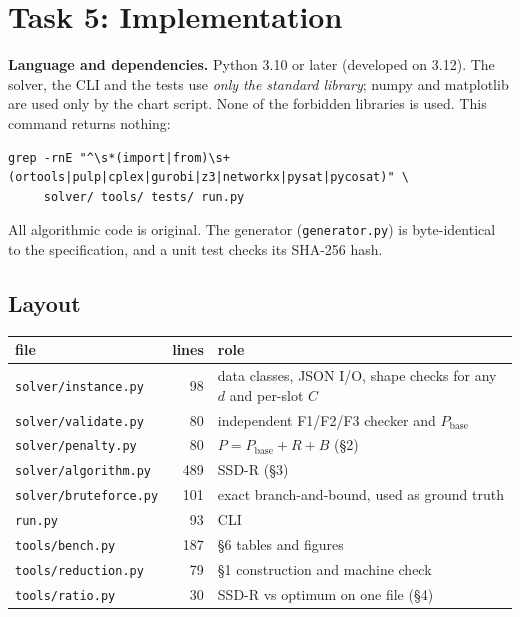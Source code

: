 \section{Task 5: Implementation}

\textbf{Language and dependencies.} Python 3.10 or later (developed on
3.12). The solver, the CLI and the tests use \emph{only the standard
library}; numpy and matplotlib are used only by the chart script. None of
the forbidden libraries is used. This command returns nothing:
\begin{verbatim}
grep -rnE "^\s*(import|from)\s+(ortools|pulp|cplex|gurobi|z3|networkx|pysat|pycosat)" \
     solver/ tools/ tests/ run.py
\end{verbatim} All algorithmic code is original. The
generator (\texttt{generator.py}) is byte-identical to the specification,
and a unit test checks its SHA-256 hash.

\subsection{Layout}
\begin{center}\small
\begin{tabular}{l r l}
\toprule
file & lines & role\\
\midrule
\texttt{solver/instance.py} & 98 & data classes, JSON I/O, shape checks for any $d$ and per-slot $C$\\
\texttt{solver/validate.py} & 80 & independent F1/F2/F3 checker and $P_{\text{base}}$\\
\texttt{solver/penalty.py} & 80 & $P = P_{\text{base}} + R + B$ (\S2)\\
\texttt{solver/algorithm.py} & 489 & SSD-R (\S3)\\
\texttt{solver/bruteforce.py} & 101 & exact branch-and-bound, used as ground truth\\
\texttt{run.py} & 93 & CLI\\
\texttt{tools/bench.py} & 187 & \S6 tables and figures\\
\texttt{tools/reduction.py} & 79 & \S1 construction and machine check\\
\texttt{tools/ratio.py} & 30 & SSD-R vs optimum on one file (\S4)\\
\bottomrule
\end{tabular}
\end{center}

